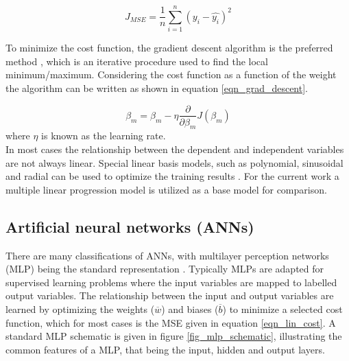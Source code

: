 \documentclass[a4paper,fleqn]{cas-sc}
\begin{document}
\begin{equation}\label{eqn_lin_cost}
J_{MSE}=\frac{1}{n}\sum^n_{i=1}(y_i-\hat{y_i})^2
\end{equation} 

To minimize the cost function, the gradient descent algorithm is the preferred method \cite{Wen2022}, which is an iterative procedure used to find the local minimum/maximum. Considering the cost function as a function of the weight the algorithm can be written as shown in equation \ref{eqn_grad_descent}.  

\begin{equation}\label{eqn_grad_descent}
\beta_{m} = \beta_m-\eta\frac{\partial}{\partial\beta_m}J(\beta_m)
\end{equation}
where $\eta$ is known as the learning rate.\\

In most cases the relationship between the dependent and independent variables are not always linear. Special linear basis models, such as polynomial, sinusoidal and radial can be used to optimize the training results \cite{Rasmussen2006}. For the current work a multiple linear progression model is utilized as a base model for comparison. 
\subsection{Artificial neural networks (ANNs)}
There are many classifications of ANNs, with multilayer perception networks (MLP) being the standard representation \citep{goodfellow}. Typically MLPs are adapted for supervised learning problems where the input variables are mapped to labelled output variables. The relationship between the input and output variables are learned by optimizing the weights ($\overline{w}$) and biases ($\overline{b}$) to minimize a selected cost function, which for most cases is the MSE given in equation \ref{eqn_lin_cost}. A standard MLP schematic is given in figure \ref{fig_mlp_schematic}, illustrating the common features of a MLP, that being the input, hidden and output layers.
\end{document}
